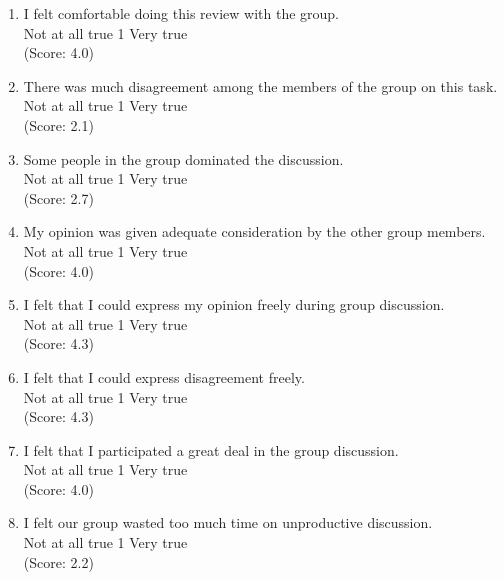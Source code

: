 \begin{enumerate}
\item I felt comfortable doing this review with the group.
\\
Not at all true \hfill 1     \hfill Very true\\
(Score: 4.0)

\item There was much disagreement among the members of the group on
this task.
\\
Not at all true \hfill 1     \hfill Very true\\
(Score: 2.1)

\item Some people in the group dominated the discussion.
\\
Not at all true \hfill 1     \hfill Very true\\
(Score: 2.7)

\item My opinion was given adequate consideration by the other group members.
\\
Not at all true \hfill 1     \hfill Very true\\
(Score: 4.0)


\item I felt that I could express my opinion freely during group discussion. 
\\
Not at all true \hfill 1     \hfill Very true\\
(Score: 4.3)

\item I felt that I could express disagreement freely.
\\
Not at all true \hfill 1     \hfill Very true\\
(Score: 4.3)

\item I felt that I participated a great deal in the group discussion.
\\
Not at all true \hfill 1     \hfill Very true\\
(Score: 4.0)

\item I felt our group wasted too much time on unproductive
discussion.
\\
Not at all true \hfill 1     \hfill Very true\\
(Score: 2.2)


\end{enumerate}
